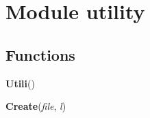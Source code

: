 %
%
%


\section{Module utility}

    \label{utility}


  \subsection{Functions}

    \label{utility:Utili}

    \vspace{0.5ex}

\hspace{.8\funcindent}\begin{boxedminipage}{\funcwidth}

    \raggedright \textbf{Utili}()

\setlength{\parskip}{2ex}
\setlength{\parskip}{1ex}
    \end{boxedminipage}

    \label{utility:Create}

    \vspace{0.5ex}

\hspace{.8\funcindent}\begin{boxedminipage}{\funcwidth}

    \raggedright \textbf{Create}(\textit{file}, \textit{l})

\setlength{\parskip}{2ex}
\setlength{\parskip}{1ex}
    \end{boxedminipage}



